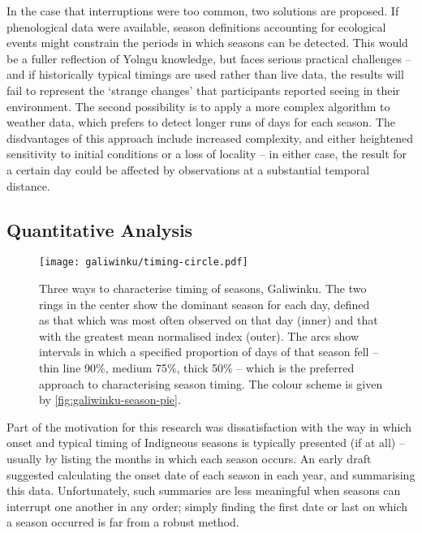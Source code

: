 In the case that interruptions were too common, two solutions are proposed.
If phenological data were available, season definitions accounting for
ecological events might constrain the periods in which seasons can be detected.
This would be a fuller reflection of Yolngu knowledge, but faces serious
practical challenges -- and if historically typical timings are used rather
than live data, the results will fail to represent the `strange changes'
that participants reported seeing in their environment.
%
The second  possibility is to apply a more complex algorithm to weather data,
which prefers to detect longer runs of days for each season.  The disdvantages
of this approach include increased complexity, and either heightened sensitivity
to initial conditions or a loss of locality -- in either case, the result for
a certain day could be affected by observations at a substantial temporal distance.


\subsection{Quantitative Analysis}
\label{subsec:disc-season-characterisation}

\begin{figure}[p]
    \centerline{
    \texttt{[image: galiwinku/timing-circle.pdf]}}
    \caption[Three ways to characterise timing of seasons, Galiwinku]{
        Three ways to characterise timing of seasons, Galiwinku.
        The two rings in the center show the dominant season for each day,
        defined as that which was most often observed on that day (inner)
        and that with the greatest mean normalised index (outer).
        The arcs show intervals in which a specified proportion of days
        of that season fell -- thin line 90\%, medium 75\%, thick 50\% --
        which is the preferred approach to characterising season timing.
        The colour scheme is given by \cref{fig:galiwinku-season-pie}.
        }
    \label{fig:galiwinku-seasons}
\end{figure}

Part of the motivation for this research was dissatisfaction with the way in
which onset and typical timing of Indigneous seasons is typically presented
(if at all) -- usually by listing the months in which each season occurs.
%
An early draft suggested calculating the onset date of each season in each
year, and summarising this data.  Unfortunately, such summaries are less
meaningful when seasons can interrupt one another in any order; simply finding
the first date or last on which a season occurred is far from a robust method.


